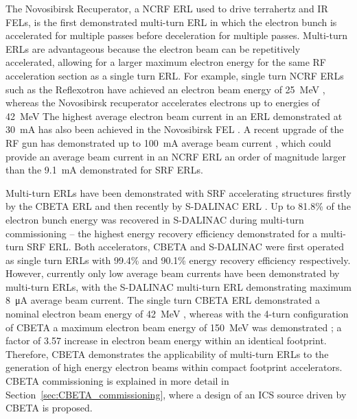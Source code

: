 \documentclass[../main.tex]{subfiles}
\begin{document}
The Novosibirsk Recuperator, a NCRF ERL used to drive terrahertz and IR FELs, is the first demonstrated multi-turn ERL \cite{gavrilov2007status} in which the electron bunch is accelerated for multiple passes before deceleration for multiple passes. Multi-turn ERLs are advantageous because the electron beam can be repetitively accelerated, allowing for a larger maximum electron energy for the same RF acceleration section as a single turn ERL. For example, single turn NCRF ERLs such as the Reflexotron have achieved an electron beam energy of 25~\si{\mega\electronvolt} \cite{schriber1977experimental}, whereas the Novosibirsk recuperator accelerates electrons up to energies of 42~\si{\mega\electronvolt} \cite{shevchenko2020novosibirsk}  The highest average electron beam current in an ERL demonstrated at 30~\si{\milli\ampere} has also been achieved in the Novosibirsk FEL \cite{gavrilov2007status}. A recent upgrade of the RF gun has demonstrated up to 100~\si{\milli\ampere} average beam current \cite{matveev2020simulation}, which could provide an average beam current in an NCRF ERL an order of magnitude larger than the 9.1~\si{\milli\ampere} \cite{neil2006jlab} demonstrated for SRF ERLs.  

Multi-turn ERLs have been demonstrated with SRF accelerating structures firstly by the CBETA ERL \cite{bartnik2020cbeta} and then recently by S-DALINAC ERL \cite{adolphsen2022european}. Up to 81.8\% of the electron bunch energy was recovered in S-DALINAC during multi-turn commissioning -- the highest energy recovery efficiency demonstrated for a multi-turn SRF ERL. Both accelerators, CBETA \cite{gulliford2021measurement} and S-DALINAC
\cite{steinhorst2021rf} were first operated as single turn ERLs with 99.4\% and 90.1\% energy recovery efficiency respectively. However, currently only low average beam currents have been demonstrated by multi-turn ERLs, with the S-DALINAC multi-turn ERL demonstrating maximum 8~\si{\micro\ampere} average beam current. The single turn CBETA ERL demonstrated a nominal electron beam energy of 42~\si{\mega\electronvolt} \cite{gulliford2021measurement}, whereas with the 4-turn configuration of CBETA a maximum electron beam energy of 150~\si{\mega\electronvolt} was demonstrated \cite{bartnik2020cbeta}; a factor of 3.57 increase in electron beam energy within an identical footprint. Therefore, CBETA demonstrates the applicability of multi-turn ERLs to the generation of high energy electron beams within compact footprint accelerators. CBETA commissioning is explained in more detail in Section~\ref{sec:CBETA_commissioning}, where a design of an ICS source driven by CBETA is proposed.
\end{document}
